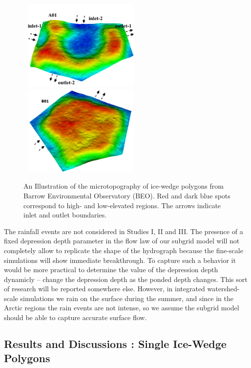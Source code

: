 \documentclass[review,11pt]{elsarticle}
\begin{document}
\begin{figure}[!h]
\includegraphics[width=6.2cm, height=4.5cm]{./figures/polygons-finescale/3DpolygonA01-3D.png}\\
\includegraphics[width=6.2cm, height=4.5cm]{./figures/polygons-finescale/3DpolygonB01-3B.png}
\caption{An Illustration of the microtopography of ice-wedge polygons from Barrow Environmental Observatory (BEO). Red and dark blue spots correspond to high- and low-elevated regions. The arrows indicate inlet and outlet boundaries.}
\label{IWP-finescale}
\end{figure}

The rainfall events are not considered in Studies I, II and III. The presence of a fixed depression depth parameter in the flow law of our subgrid model will not completely allow to replicate the shape of the hydrograph because the fine-scale simulations will show immediate breakthrough. To capture such a behavior it would be more practical to determine the value of the depression depth dynamicly -- change the depression depth as the ponded depth changes. This sort of research will be reported somewhere else. However, in integrated watershed-scale simulations we rain on the surface during the summer, and since in the Arctic regions the rain events are not intense, so we assume the subgrid model should be able to capture accurate surface flow. 


\FloatBarrier
\subsection{Results and Discussions : Single Ice-Wedge Polygons}
\end{document}
